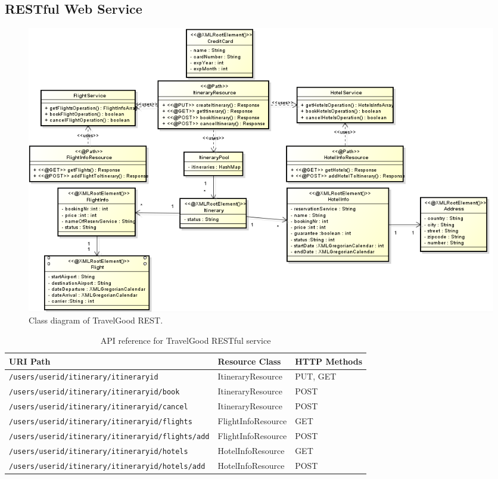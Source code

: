 \subsection{RESTful Web Service}

\begin{figure}[H]
\centering
\includegraphics[width=\textwidth]{images/REST}
\caption{Class diagram of TravelGood REST.}
\label{classdiagramREST}
\end{figure}

\begin{table}[H]
\begin{adjustwidth}{-1cm}{-1cm}
\centering
\begin{tabular}{|l|l|l|} \hline
\textbf{URI Path} & \textbf{Resource Class} & \textbf{HTTP Methods} \\ \hline
\texttt{/users/{userid}/itinerary/{itineraryid}} & ItineraryResource & PUT, GET \\ \hline
\texttt{/users/{userid}/itinerary/{itineraryid}/book} & ItineraryResource & POST \\ \hline
\texttt{/users/{userid}/itinerary/{itineraryid}/cancel} & ItineraryResource & POST \\ \hline
\texttt{/users/{userid}/itinerary/{itineraryid}/flights} & FlightInfoResource & GET \\ \hline
\texttt{/users/{userid}/itinerary/{itineraryid}/flights/add} & FlightInfoResource & POST \\ \hline
\texttt{/users/{userid}/itinerary/{itineraryid}/hotels} & HotelInfoResource & GET \\ \hline
\texttt{/users/{userid}/itinerary/{itineraryid}/hotels/add} & HotelInfoResource & POST \\ \hline
\end{tabular}
\caption{API reference for TravelGood RESTful service}
\label{tableAPIref}
\end{adjustwidth}
\end{table}

